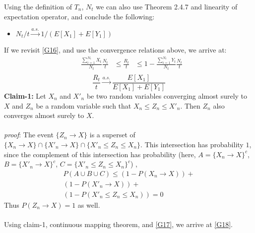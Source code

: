 \documentclass{article}
\begin{document}
Using the definition of $T_n$, $N_t$ we can also use Theorem 2.4.7 \cite{10.5555/1869916} and linearity of expectation operator, and conclude the following: 
\begin{itemize}
    \item $N_{t}/t \xrightarrow{a.s.} 1/(E[X_1] + E[Y_1])$
\end{itemize}
If we revisit \ref{G16}, and use the convergence relations above, we arrive at: 
\begin{equation}
    \label{G17}
    \begin{array}{cccc}
         & \frac{\sum_{i=1}^{N_t} X_t}{N_t} \frac{N_t}{t}&\leq \frac{R_t}{t} &\leq 1 - \frac{\sum_{i=1}^{N_t} Y_t}{N_t} \frac{N_t}{t}\\
         
    \end{array}
\end{equation}
\begin{equation}
    \label{G18}
    \frac{R_t}{t}\xrightarrow{a.s.} \frac{E[X_1]}{E[X_1] + E[Y_1]}
\end{equation}
\textbf{Claim-1:} Let $X_n$ and $X'_n$ be two random variables converging almost surely to $X$ and $Z_n$ be a random variable such that $X_n \leq Z_n \leq X'_n$. Then $Z_n$ also converges almost surely to $X$. \\\\
\textit{proof}: The event $\{Z_n \to X\}$ is a superset of $\{X_n \to X\} \cap \{X'_n \to X\} \cap \{X'_n \leq Z_n \leq X_n\}$. This intersection has probability $1$, since the complement of this intersection has probability (here, $A = \{X_n \to X\}^c$, $B = \{X'_n \to X\}^c$, $ C =\{X'_n \le Z_n \le X_n\}^c$) , 
\begin{multline*}
    P( A\cup  B\cup C)
\le (1-P(X_n \to X)) +\\ (1-P(X'_n\to X)) +\\ (1-P(X'_n \le Z_n \le X_n)) = 0
\end{multline*}
Thus $P(Z_n \to X)=1$ as well.\\\\
Using claim-1, continuous mapping theorem, and \ref{G17}, we arrive at \ref{G18}. 
\newpage 
\end{document}
